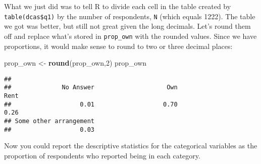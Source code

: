 \documentclass[]{article}
\newenvironment{Shaded}{\begin{snugshade}}{\end{snugshade}}
\newcommand{\KeywordTok}[1]{\textcolor[rgb]{0.13,0.29,0.53}{\textbf{{#1}}}}
\newcommand{\DecValTok}[1]{\textcolor[rgb]{0.00,0.00,0.81}{{#1}}}
\newcommand{\StringTok}[1]{\textcolor[rgb]{0.31,0.60,0.02}{{#1}}}
\newcommand{\NormalTok}[1]{{#1}}
\begin{document}
What we just did was to tell R to divide each cell in the table created
by \texttt{table(dcas\$q1)} by the number of respondents, \texttt{N}
(which equals 1222). The table we got was better, but still not great
given the long decimals. Let's round them off and replace what's stored
in \texttt{prop\_own} with the rounded values. Since we have
proportions, it would make sense to round to two or three decimal
places:

\begin{Shaded}
\begin{Highlighting}[]
\NormalTok{prop_own <-}\StringTok{ }\KeywordTok{round}\NormalTok{(prop_own,}\DecValTok{2}\NormalTok{)}
\NormalTok{prop_own}
\end{Highlighting}
\end{Shaded}

\begin{verbatim}
## 
##              No Answer                    Own                   Rent 
##                   0.01                   0.70                   0.26 
## Some other arrangement 
##                   0.03
\end{verbatim}

Now you could report the descriptive statistics for the categorical
variables as the proportion of respondents who reported being in each
category.
\end{document}
